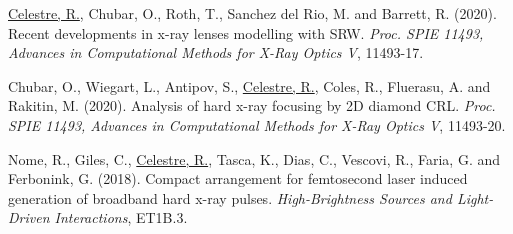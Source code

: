 \underline{Celestre, R.}, Chubar, O., Roth, T., Sanchez del Rio, M. and Barrett, R. (2020). Recent developments in x-ray lenses modelling with SRW. \textit{Proc. SPIE 11493, Advances in Computational Methods for X-Ray Optics V}, 11493-17.

Chubar, O., Wiegart, L., Antipov, S., \underline{Celestre, R.}, Coles, R., Fluerasu, A. and Rakitin, M. (2020).  Analysis of hard x-ray focusing by 2D diamond CRL. \textit{Proc. SPIE 11493, Advances in Computational Methods for X-Ray Optics V}, 11493-20.

Nome, R., Giles, C., \underline{Celestre, R.}, Tasca, K., Dias, C., Vescovi, R., Faria, G. and Ferbonink, G. (2018). Compact arrangement for femtosecond laser induced generation of broadband hard x-ray pulses. \textit{High-Brightness Sources and Light-Driven Interactions}, ET1B.3.

